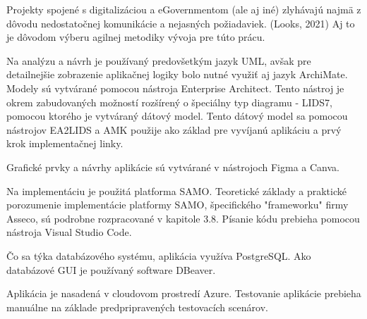 Projekty spojené s digitalizáciou a eGovernmentom (ale aj iné) zlyhávajú najmä z dôvodu nedostatočnej komunikácie a nejasných požiadaviek. \scr(Looks, 2021) Aj to je dôvodom výberu agilnej metodiky vývoja pre túto prácu.

Na analýzu a návrh je používaný predovšetkým jazyk UML, avšak pre detailnejšie zobrazenie aplikačnej logiky bolo nutné využiť aj jazyk ArchiMate. Modely sú vytvárané pomocou nástroja Enterprise Architect. Tento nástroj je okrem zabudovaných možností rozšírený o špeciálny typ diagramu - LIDS7, pomocou ktorého je vytváraný dátový model. Tento dátový model sa pomocou nástrojov EA2LIDS a AMK použije ako základ pre vyvíjanú aplikáciu a prvý krok implementačnej linky. 

Grafické prvky a návrhy aplikácie sú vytvárané v nástrojoch Figma a Canva.

Na implementáciu je použitá platforma SAMO. Teoretické základy a praktické porozumenie implementácie platformy SAMO, špecifického "frameworku" firmy Asseco, sú podrobne rozpracované v kapitole 3.8. Písanie kódu prebieha pomocou nástroja Visual Studio Code.

Čo sa týka databázového systému, aplikácia využíva PostgreSQL. Ako databázové GUI je používaný software DBeaver.

Aplikácia je nasadená v cloudovom prostredí Azure. Testovanie aplikácie prebieha manuálne na základe predpripravených testovacích scenárov.


%




%
%
%
%
%
%

